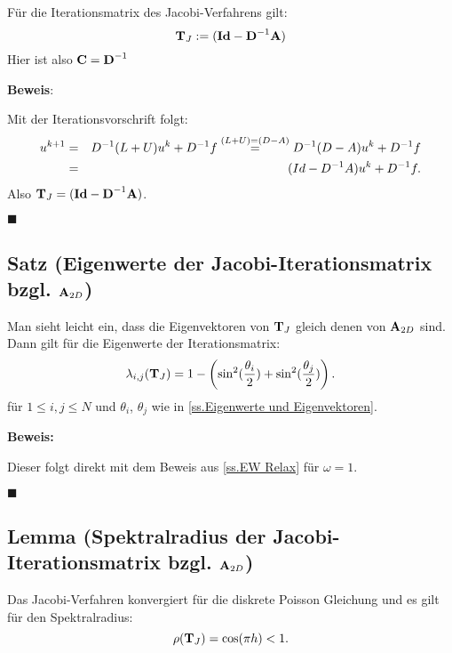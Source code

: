 Für die Iterationsmatrix des Jacobi-Verfahrens gilt:
\begin{equation}
{\textbf{T}}_{J} := ({\textbf{Id}} - {\textbf{D}}^{-1} {\textbf{A}})
\end{equation}
Hier ist also ${\textbf{C}} = {\textbf{D}}^{-1}$

\textbf{Beweis}:

Mit der Iterationsvorschrift folgt:
\begin{eqnarray}
u^{k+1} &=& D^{-1}(L+U)u^{k} + D^{-1}f \overset{(L+U)=(D-A)}{=} D^{-1}(D-A)u^{k}+D^{-1}f \notag \\
&=& (Id-D^{-1}A)u^{k} + D^{-1}f. \notag
\end{eqnarray}
Also ${\textbf{T}}_{J} = ({\textbf{Id}} - {\textbf{D}}^{-1} {\textbf{A}})$.
\begin{flushright}
$\blacksquare$
\end{flushright}

\subsection{Satz (Eigenwerte der Jacobi-Iterationsmatrix bzgl. ${\textbf{A}}_{2D}$)}\label{ss.EW Jacobi}

Man sieht leicht ein, dass die Eigenvektoren von ${\textbf{T}}_{J}$ gleich denen von ${\textbf{A}}_{2D}$ sind. Dann gilt für die Eigenwerte der Iterationsmatrix:
\begin{equation}
\lambda_{i,j}({\textbf{T}}_{J}) = 1 - \left(\sin^{2}(\frac {\theta_{i}} {2}) + \sin^{2}(\frac {\theta_{j}} {2}) \right). \label{eq.Jacobi-Eigenwerte}
\end{equation}
für $1 \le i,j \le N$ und $\theta_{i}$, $\theta_{j}$ wie in \autoref{ss.Eigenwerte und Eigenvektoren}.

\textbf{Beweis:}\label{b.EW Jacobi}

Dieser folgt direkt mit dem Beweis aus \autoref{ss.EW Relax} für $\omega = 1$.
\begin{flushright}
$\blacksquare$
\end{flushright}

\subsection{Lemma (Spektralradius der Jacobi-Iterationsmatrix bzgl. ${\textbf{A}}_{2D}$)}\label{ss.Spektralradius Jacobi}

Das Jacobi-Verfahren konvergiert für die diskrete Poisson Gleichung und es gilt für den Spektralradius:
\begin{equation}
\rho({\textbf{T}}_{J}) = \cos(\pi h) < 1.
\end{equation}

